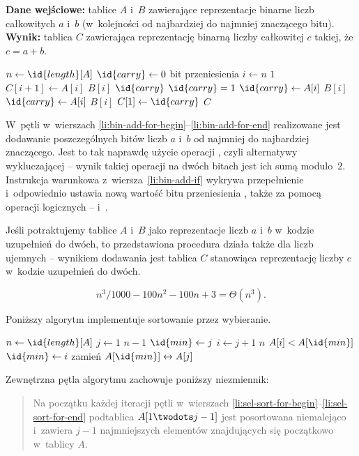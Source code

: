 \exercise %
\textbf{Dane wejściowe:}  tablice $A$ i~$B$ zawierające reprezentacje binarne  liczb całkowitych $a$ i~$b$ (w~kolejności od najbardziej do najmniej znaczącego bitu). \\
\textbf{Wynik:}  tablica $C$ zawierająca reprezentację binarną  liczby całkowitej $c$ takiej, że $c=a+b$.
\begin{codebox}
\li	$n\gets\id{length}[A]$
\li	$\id{carry}\gets0$ \>\>\>\>\Comment bit przeniesienia
\li	\For $i\gets n$ \Downto $1$ \label{li:bin-add-for-begin}
\li		\Do
			$C[i+1]\gets A[i]$ \kw{xor} $B[i]$  $\id{carry}$ \label{li:bin-add-xor}
\li			\If $\id{carry}=1$ \label{li:bin-add-if}
\li				\Then
					$\id{carry}\gets A[i]$  $B[i]$
\li				\Else
					$\id{carry}\gets A[i]$  $B[i]$
				\End
		\End \label{li:bin-add-for-end}
\li	$C[1]\gets\id{carry}$
\li	\Return $C$
\end{codebox}

W~pętli  w~wierszach \ref{li:bin-add-for-begin}\nobreakdash--\ref{li:bin-add-for-end} realizowane jest dodawanie poszczególnych bitów liczb $a$ i~$b$ od najmniej do najbardziej znaczącego. Jest to tak naprawdę użycie operacji , czyli alternatywy wykluczającej -- wynik takiej operacji na dwóch bitach jest ich sumą modulo~2. Instrukcja warunkowa z~wiersza~\ref{li:bin-add-if} wykrywa przepełnienie i~odpowiednio ustawia nową wartość bitu przeniesienia , także za pomocą operacji logicznych --  i~.

Jeśli potraktujemy tablice $A$ i~$B$ jako reprezentacje liczb $a$ i~$b$ w~kodzie uzupełnień do dwóch, to przedstawiona procedura działa także dla liczb ujemnych -- wynikiem dodawania jest tablica $C$ stanowiąca reprezentację liczby $c$ w~kodzie uzupełnień do dwóch.


\exercise %
\[
	n^3\!/1000-100n^2-100n+3 = \Theta(n^3).
\]

\exercise %
Poniższy algorytm implementuje sortowanie przez wybieranie.
\begin{codebox}
\li	$n\gets\id{length}[A]$
\li	\For $j\gets1$ \To $n-1$ \label{li:sel-sort-for-begin}
\li		\Do
			$\id{min}\gets j$
\li			\For $i\gets j+1$ \To $n$
\li				\Do
					\If $A[i]<A[\id{min}]$
\li						\Then
							$\id{min}\gets i$
						\End
				\End
\li			zamień $A[\id{min}]\leftrightarrow A[j]$
		\End \label{li:sel-sort-for-end}
\end{codebox}
Zewnętrzna pętla algorytmu zachowuje poniższy niezmiennik:
\begin{quote}
Na początku każdej iteracji pętli  w~wierszach \ref{li:sel-sort-for-begin}\nobreakdash--\ref{li:sel-sort-for-end} podtablica $A[1\twodots j-1]$ jest posortowana niemalejąco i~zawiera $j-1$ najmniejszych elementów znajdujących się początkowo w~tablicy $A$.
\end{quote}

